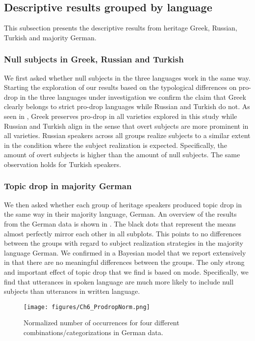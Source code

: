 \documentclass[output=paper,colorlinks,citecolor=brown]{langscibook}
\begin{document}
\subsection{Descriptive results grouped by language} \label{sec:oezsoy:descriptiveresults}
This subsection presents the descriptive results from heritage Greek, Russian, Turkish and majority German.

\subsubsection{Null subjects in Greek, Russian and Turkish} 
We first asked whether null subjects in the three languages work in the same way. Starting the exploration of our results based on the typological differences on pro-drop in the three languages under investigation we confirm the claim that Greek clearly belongs to strict pro-drop languages while Russian and Turkish do not. As seen in , Greek preserves pro-drop in all varieties explored in this study while Russian and Turkish align in the sense that overt subjects are more prominent in all varieties. Russian speakers across all groups realize subjects to a similar extent in the condition where the subject realization is expected. Specifically, the amount of overt subjects is higher than the amount of null subjects. The same observation holds for Turkish speakers.

\subsubsection{Topic drop in majority German}
We then asked whether each group of heritage speakers produced topic drop in the same way in their majority language, German. An overview of the results from the German data is shown in . The black dots that represent the means almost perfectly mirror each other in all subplots. This points to no differences between the groups with regard to subject realization strategies in the majority language German. We confirmed in a Bayesian model that we report extensively in \textcite{ozsoyGermanTopicDrop} that there are no meaningful differences between the groups. The only strong and important effect of topic drop that we find is based on mode. Specifically, we find that utterances in spoken language are much more likely to include null subjects than utterances in written language.

\begin{figure}[ht]
    \centering
    \texttt{[image: figures/Ch6\_ProdropNorm.png]}
    \caption{Normalized number of occurrences for four different combinations/categorizations in German data.}
    \label{fig:oezsoy:ProDropGerman}
\end{figure}
\end{document}
